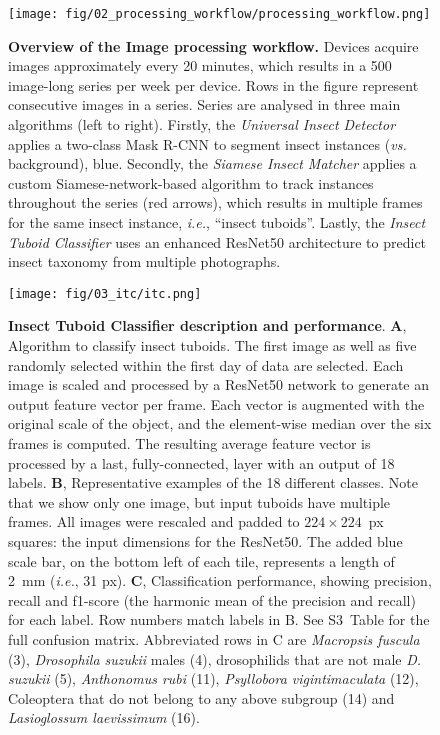 \documentclass[12pt]{article}
\begin{document}
	\begin{figure}[ht]
		\centering
		\texttt{[image: fig/02\_processing\_workflow/processing\_workflow.png]}
		\caption{\textbf{Overview of the Image processing workflow.} Devices acquire images approximately every 20 minutes, which results in a 500 image-long series per week per device. Rows in the figure represent consecutive images in a series. Series are analysed in three main algorithms (left to right). Firstly, the \emph{Universal Insect Detector} applies a two-class Mask R-CNN to segment insect instances (\emph{vs.} background), blue. Secondly, the \emph{Siamese Insect Matcher} applies a custom Siamese-network-based algorithm to track instances throughout the series (red arrows), which results in multiple frames for the same insect instance, \emph{i.e.}, “insect tuboids”. Lastly, the \emph{Insect Tuboid Classifier} uses an enhanced ResNet50 architecture to predict insect taxonomy from multiple photographs.}
		\label{fig:02}
	\end{figure}
	
	\pagebreak
	
	\begin{figure}[ht]
		\centering
		\texttt{[image: fig/03\_itc/itc.png]}
		\caption{\textbf{Insect Tuboid Classifier description and performance}. \textbf{A}, Algorithm to classify insect tuboids. The first image as well as five randomly selected within the first day of data are selected. Each image is scaled and processed by a ResNet50 network to generate an output feature vector per frame. Each vector is augmented with the original scale of the object, and the element-wise median over the six frames is computed. The resulting average feature vector is processed by a last, fully-connected, layer with an output of 18 labels. 
		\textbf{B}, Representative examples of the 18 different classes. 
		Note that we show only one image, but input tuboids have multiple frames.
        All images were rescaled and padded to $224\times224$~px squares: the input dimensions for the ResNet50.
        The added blue scale bar, on the bottom left of each tile, represents a length of 2~mm (\emph{i.e.}, 31 px).
		\textbf{C}, Classification performance, showing precision, recall and f1-score (the harmonic mean of the precision and recall) for each label. 
		Row numbers match labels in B. See S3~Table for the full confusion matrix.
		Abbreviated rows in C are \emph{Macropsis fuscula} (3), \emph{Drosophila suzukii} males (4), drosophilids that are not male \emph{D. suzukii} (5), \emph{Anthonomus rubi} (11), \emph{Psyllobora vigintimaculata} (12), Coleoptera that do not belong to any above subgroup (14) and \emph{Lasioglossum laevissimum} (16).
		}
		\label{fig:03}
	\end{figure}
	
\end{document}
